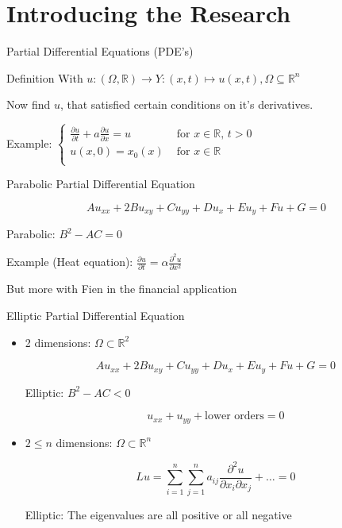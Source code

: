 \documentclass[]{beamer}
\begin{document}
\section{Introducing the Research}
\begin{frame}{Partial Differential Equations (PDE's)}
    \begin{kulblock}{Definition}
        With $u:(\Omega,\mathbb{R}) \to Y:(x,t) \mapsto u(x,t), \Omega \subseteq \mathbb{R}^n$
    
        Now find $u$, that satisfied certain conditions on it's derivatives. 
    \end{kulblock}

    Example: $\begin{cases}
        \frac{\partial u}{\partial t} + a \frac{\partial u}{\partial x} = u & \text{ for } x \in \mathbb{R}, \, t > 0 \\
		u(x,0) = x_0 (x) & \text{ for } x \in \mathbb{R} \\
    \end{cases}$
    
\end{frame}
\begin{frame}{Parabolic Partial Differential Equation}
    \centering

    $$A u_{xx} + 2B u_{xy} + C u_{yy} + D u_x + E u_y + F u + G = 0$$

    Parabolic: $B^2 - AC = 0$\\

    \vspace{8mm}

    Example (Heat equation): $\frac{\partial u}{\partial t} = \alpha \frac{\partial^2 u}{\partial x^2}$

    But more with Fien in the financial application

\end{frame}
\begin{frame}{Elliptic Partial Differential Equation}
    \begin{itemize}[<+->]
        \item 2 dimensions: $\Omega \subset \mathbb{R}^2$

            $$A u_{xx} + 2B u_{xy} + C u_{yy} + D u_x + E u_y + F u + G = 0$$

            Elliptic: $B^2 - AC < 0$

            $$u_{xx} + u_{yy} + \text{lower orders} = 0$$
            
        \item $2 \leqslant n$ dimensions: $\Omega \subset \mathbb{R}^n$

            $$L u = \sum_{i=1}^n \sum_{j=1}^n a_{ij} \frac{\partial^2 u}{\partial x_i \partial x_j} + \dots = 0$$

            Elliptic: The eigenvalues are all positive or all negative
    \end{itemize}
\end{frame}
\end{document}
